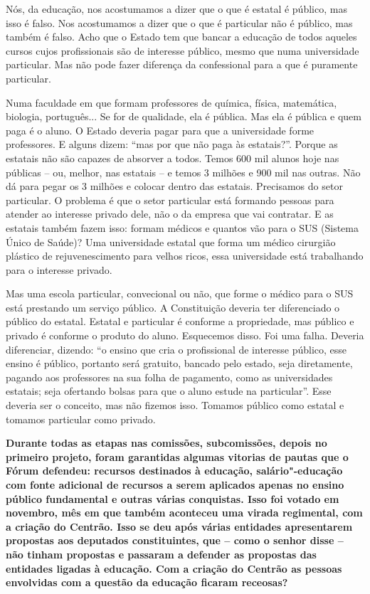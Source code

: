 Nós, da educação, nos acostumamos a dizer que o que é estatal é público,
mas isso é falso. Nos acostumamos a dizer que o que é particular não é
público, mas também é falso. Acho que o Estado tem que bancar a educação
de todos aqueles cursos cujos profissionais são de interesse público,
mesmo que numa universidade particular. Mas não pode fazer diferença da
confessional para a que é puramente particular.

Numa faculdade em que formam professores de química, física, matemática,
biologia, português... Se for de qualidade, ela é pública. Mas ela é
pública e quem paga é o aluno. O Estado deveria pagar para que a
universidade forme professores. E alguns dizem: ``mas por que não paga
às estatais?''. Porque as estatais não são capazes de absorver a todos.
Temos 600 mil alunos hoje nas públicas -- ou, melhor, nas estatais -- e
temos 3 milhões e 900 mil nas outras. Não dá para pegar os 3 milhões e
colocar dentro das estatais. Precisamos do setor particular. O problema
é que o setor particular está formando pessoas para atender ao interesse
privado dele, não o da empresa que vai contratar. E as estatais também
fazem isso: formam médicos e quantos vão para o SUS (Sistema Único de
Saúde)? Uma universidade estatal que forma um médico cirurgião plástico
de rejuvenescimento para velhos ricos, essa universidade está
trabalhando para o interesse privado.

Mas uma escola particular, convecional ou não, que forme o médico para o
SUS está prestando um serviço público. A Constituição deveria ter
diferenciado o público do estatal. Estatal e particular é conforme a
propriedade, mas público e privado é conforme o produto do aluno.
Esquecemos disso. Foi uma falha. Deveria diferenciar, dizendo: ``o
ensino que cria o profissional de interesse público, esse ensino é
público, portanto será gratuito, bancado pelo estado, seja diretamente,
pagando aos professores na sua folha de pagamento, como as universidades
estatais; seja ofertando bolsas para que o aluno estude na particular''.
Esse deveria ser o conceito, mas não fizemos isso. Tomamos público como
estatal e tomamos particular como privado.

\textbf{Durante todas as etapas nas comissões, subcomissões, depois no
primeiro projeto, foram garantidas algumas vitorias de pautas que o
Fórum defendeu: recursos destinados à educação, salário"-educação com
fonte adicional de recursos a serem aplicados apenas no ensino público
fundamental e outras várias conquistas. Isso foi votado em novembro, mês
em que também aconteceu uma virada regimental, com a criação do Centrão.
Isso se deu após várias entidades apresentarem propostas aos deputados
constituintes, que -- como o senhor disse -- não tinham propostas e
passaram a defender as propostas das entidades ligadas à educação. Com a
criação do Centrão as pessoas envolvidas com a questão da educação
ficaram receosas?}

